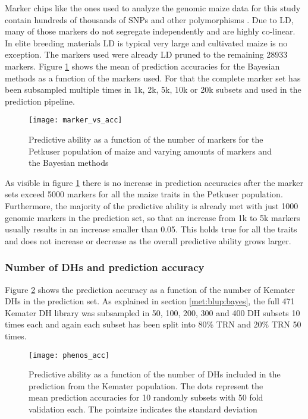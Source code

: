 Marker chips like the ones used to analyze the genomic maize data for this study contain
hundreds of thousands of SNPs and other polymorphisms \cite{unterseer2014powerful}. Due to
LD, many of those markers do not segregate independently and are highly co-linear. In
elite breeding materials LD is typical very large and cultivated maize is no
exception. The markers used were already LD pruned to the remaining 28933 markers. Figure
\ref{fig:marker_vs_acc} shows the mean of prediction accuracies for the Bayesian methods
as a function of the markers used. For that the complete marker set has been subsampled
multiple times in 1k, 2k, 5k, 10k or 20k subsets and used in the prediction pipeline.

\begin{figure}[H]
 \centering \texttt{[image: marker\_vs\_acc]}
 \decoRule
 \caption[Predictive ability as a function of the number of markers]{Predictive ability as
   a function of the number of markers for the Petkuser population of maize and varying
   amounts of markers and the Bayesian methods}
\label{fig:marker_vs_acc}
\end{figure}

As visible in figure \ref{fig:marker_vs_acc} there is no increase in prediction accuracies
after the marker sets exceed 5000 markers for all the maize traits in the Petkuser
population. Furthermore, the majority of the predictive ability is already met with just
1000 genomic markers in the prediction set, so that an increase from 1k to 5k markers
usually results in an increase smaller than 0.05. This holds true for all the traits and
does not increase or decrease as the overall predictive ability grows larger.

\subsubsection{Number of DHs and prediction accuracy}

Figure \ref{fig:phenos_vs_acc} shows the prediction accuracy as a function of the number
of Kemater DHs in the prediction set. As explained in section \ref{met:blup:bayes}, the
full 471 Kemater DH library was subsampled in 50, 100, 200, 300 and 400 DH subsets 10 times
each and again each subset has been split into 80\% TRN and 20\% TRN 50 times.

\begin{figure}[H]
 \centering \texttt{[image: phenos\_acc]}
 \decoRule
 \caption[Predictive ability as a function of the number of DHs]{Predictive ability as
   a function of the number of DHs included in the prediction from the Kemater
   population. The dots represent the mean prediction accuracies for 10 randomly subsets
   with 50 fold validation each. The pointsize indicates the standard deviation}
\label{fig:phenos_vs_acc}
\end{figure}

